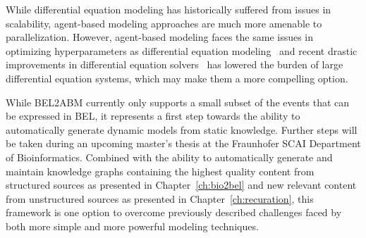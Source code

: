 While differential equation modeling has historically suffered from issues in scalability, agent-based modeling approaches are much more amenable to parallelization.
However, agent-based modeling faces the same issues in optimizing hyperparameters as differential equation modeling~\cite{Stapor2018} and recent drastic improvements in differential equation solvers~\cite{Chen2018,Bar-Sinai2019,Innes2019} has lowered the burden of large differential equation systems, which may make them a more compelling option.

While BEL2ABM currently only supports a small subset of the events that can be expressed in \ac{BEL}, it represents a first step towards the ability to automatically generate dynamic models from static knowledge.
Further steps will be taken during an upcoming master's thesis at the Fraunhofer SCAI Department of Bioinformatics.
Combined with the ability to automatically generate and maintain knowledge graphs containing the highest quality content from structured sources as presented in Chapter~\ref{ch:bio2bel} and new relevant content from unstructured sources as presented in Chapter~\ref{ch:recuration}, this framework is one option to overcome previously described challenges faced by both more simple and more powerful modeling techniques.
